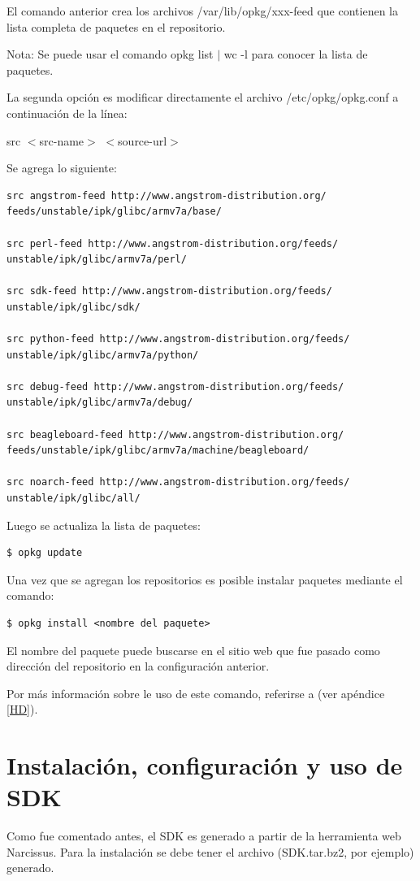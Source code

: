El comando anterior crea los archivos /var/lib/opkg/xxx-feed que contienen la lista completa de paquetes en el repositorio. 

\bigskip
Nota: Se puede usar el comando opkg list $|$ wc -l para conocer la lista de paquetes. 

\bigskip
La segunda opción es modificar directamente el archivo /etc/opkg/opkg.conf a continuación de la línea: 

\bigskip
src $<$src-name$>$ $<$source-url$>$

\bigskip
Se agrega lo siguiente: 

\begin{verbatim}
src angstrom-feed http://www.angstrom-distribution.org/
feeds/unstable/ipk/glibc/armv7a/base/ 

src perl-feed http://www.angstrom-distribution.org/feeds/
unstable/ipk/glibc/armv7a/perl/ 

src sdk-feed http://www.angstrom-distribution.org/feeds/
unstable/ipk/glibc/sdk/ 

src python-feed http://www.angstrom-distribution.org/feeds/
unstable/ipk/glibc/armv7a/python/ 

src debug-feed http://www.angstrom-distribution.org/feeds/
unstable/ipk/glibc/armv7a/debug/ 

src beagleboard-feed http://www.angstrom-distribution.org/
feeds/unstable/ipk/glibc/armv7a/machine/beagleboard/ 

src noarch-feed http://www.angstrom-distribution.org/feeds/
unstable/ipk/glibc/all/ 
\end{verbatim}

Luego se actualiza la lista de paquetes:

\begin{verbatim}
$ opkg update
\end{verbatim}

Una vez que se agregan los repositorios es posible instalar paquetes mediante el comando: 

\begin{verbatim}
$ opkg install <nombre del paquete>
\end{verbatim}

El nombre del paquete puede buscarse en el sitio web que fue pasado como dirección del repositorio en la configuración anterior.

\bigskip
Por más información sobre le uso de este comando, referirse a \cite{AngManual} (ver apéndice \ref{HD}).

\section{Instalación, configuración y uso de SDK}\label{anx_sw_SDK}
Como fue comentado antes, el SDK es generado a partir de la herramienta web Narcissus. Para la instalación se debe tener el archivo (SDK.tar.bz2, por ejemplo) generado.

